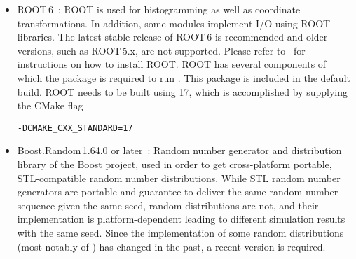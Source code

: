 \begin{itemize}
\item ROOT\,6~\cite{root}:
ROOT is used for histogramming as well as coordinate transformations.
In addition, some modules implement I/O using ROOT libraries.
The latest stable release of ROOT\,6 is recommended and older versions, such as ROOT\,5.x, are not supported.
Please refer to~\cite{rootinstallation} for instructions on how to install ROOT.
ROOT has several components of which the  package is required to run \apsq.
This package is included in the default build. ROOT needs to be built using {\CPP}17, which is accomplished by supplying the CMake flag
\begin{verbatim}
-DCMAKE_CXX_STANDARD=17
\end{verbatim}
\item Boost.Random\,1.64.0 or later~\cite{boostrandom}:
Random number generator and distribution library of the Boost project, used in order to get cross-platform portable, STL-compatible random number distributions.
While STL random number generators are portable and guarantee to deliver the same random number sequence given the same seed, random distributions are not, and their implementation is platform-dependent leading to different simulation results with the same seed.
Since the implementation of some random distributions (most notably of ) has changed in the past, a recent version is required.
\end{itemize}

